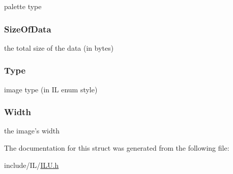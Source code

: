 palette type 

\hypertarget{struct_i_l_uinfo_ad3bfe4c8a6696b42835730f7b70327b7}{
\subsubsection[{Size\+Of\+Data}]{ Size\+Of\+Data}}\label{struct_i_l_uinfo_ad3bfe4c8a6696b42835730f7b70327b7}


the total size of the data (in bytes) 

\hypertarget{struct_i_l_uinfo_a437e4fc3b579e2e7879dedd0fd2ac587}{
\subsubsection[{Type}]{ Type}}\label{struct_i_l_uinfo_a437e4fc3b579e2e7879dedd0fd2ac587}


image type (in I\+L enum style) 

\hypertarget{struct_i_l_uinfo_a4146e7b2b0b4097e0e335f9b348392bf}{
\subsubsection[{Width}]{ Width}}\label{struct_i_l_uinfo_a4146e7b2b0b4097e0e335f9b348392bf}


the image's width 



The documentation for this struct was generated from the following file\+:\begin{DoxyCompactItemize}
\item 
include/\+I\+L/\hyperlink{_i_l_u_8h}{I\+L\+U.\+h}\end{DoxyCompactItemize}
